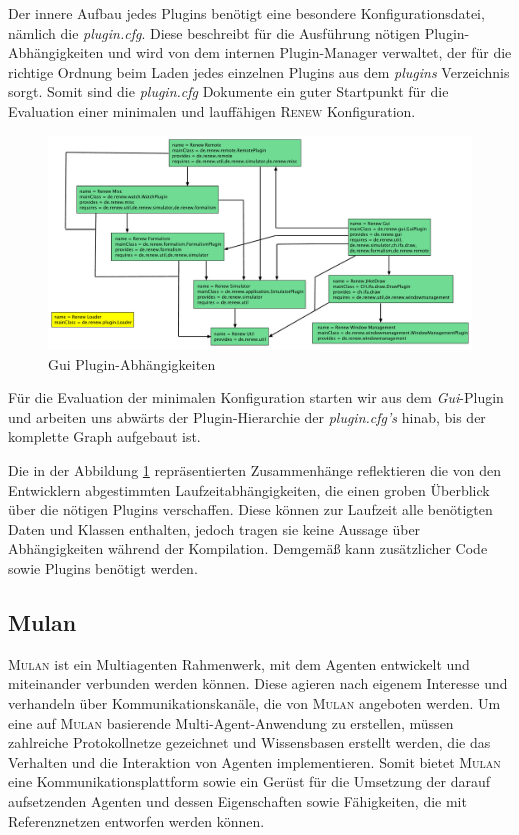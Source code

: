 		Der innere Aufbau jedes Plugins benötigt eine besondere Konfigurationsdatei, nämlich die \textit{plugin.cfg}. Diese beschreibt für die Ausführung nötigen Plugin-Abhängigkeiten und wird von dem internen Plugin-Manager verwaltet, der für die richtige Ordnung beim Laden jedes einzelnen Plugins aus dem \textit{plugins} Verzeichnis sorgt. Somit sind die \textit{plugin.cfg} Dokumente ein guter Startpunkt für die Evaluation einer minimalen und lauffähigen \textsc{Renew} Konfiguration. \bigbreak

		\begin{figure}[h!]
		  \centering
		  \includegraphics[scale=0.38, angle=90]{material/images/renew_plugin_dependencies2.pdf}
		  \caption{Gui Plugin-Abhängigkeiten}
		  \label{fig:plugin_deps}
		\end{figure}

		Für die Evaluation der minimalen Konfiguration starten wir aus dem \textit{Gui}-Plugin und arbeiten uns abwärts der Plugin-Hierarchie der \textit{plugin.cfg's} hinab, bis der komplette Graph aufgebaut ist. \newline

		Die in der Abbildung \ref{fig:plugin_deps} repräsentierten Zusammenhänge reflektieren die von den Entwicklern abgestimmten Laufzeitabhängigkeiten, die einen groben Überblick über die nötigen Plugins verschaffen. Diese können zur Laufzeit alle benötigten Daten und Klassen enthalten, jedoch tragen sie keine Aussage über Abhängigkeiten während der Kompilation. Demgemäß kann zusätzlicher Code sowie Plugins benötigt werden. 

	\subsection{Mulan} \label{sub:mulan}
		\textsc{Mulan} \cite{Roelke04} ist ein Multiagenten Rahmenwerk, mit dem Agenten entwickelt und miteinander verbunden werden können. Diese agieren nach eigenem Interesse und verhandeln über Kommunikationskanäle, die von \textsc{Mulan} angeboten werden. Um eine auf \textsc{Mulan} basierende Multi-Agent-Anwendung zu erstellen, müssen zahlreiche Protokollnetze gezeichnet und Wissensbasen erstellt werden, die das Verhalten und die Interaktion von Agenten implementieren. Somit bietet \textsc{Mulan} eine Kommunikationsplattform sowie ein Gerüst für die Umsetzung der darauf aufsetzenden Agenten und dessen Eigenschaften sowie Fähigkeiten, die mit Referenznetzen entworfen werden können. \cite{Cabac10a} \bigbreak

